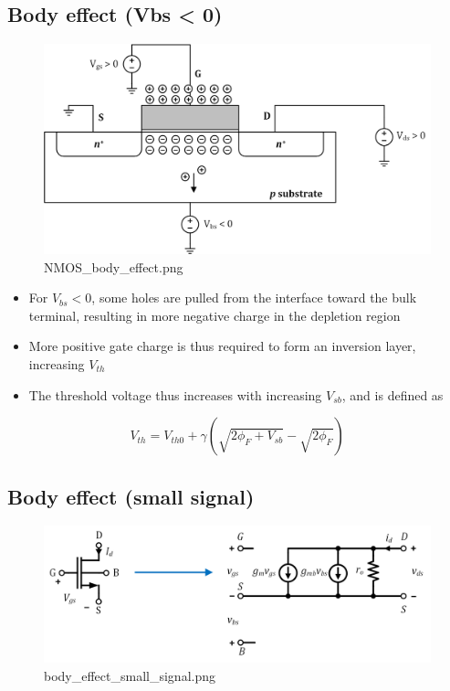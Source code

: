 \documentclass[11pt]{article}
\providecommand{\tightlist}{%
      \setlength{\itemsep}{0pt}\setlength{\parskip}{0pt}}
\begin{document}
    \hypertarget{body-effect-vbs-0}{%
\subsection{Body effect (Vbs \textless{} 0)}\label{body-effect-vbs-0}}

    \begin{figure}
\centering
\includegraphics{NMOS_body_effect.png}
\caption{NMOS\_body\_effect.png}
\end{figure}

    \begin{itemize}
\tightlist
\item
  For \(V_{bs} < 0\), some holes are pulled from the interface toward
  the bulk terminal, resulting in more negative charge in the depletion
  region
\item
  More positive gate charge is thus required to form an inversion layer,
  increasing \(V_{th}\)
\item
  The threshold voltage thus increases with increasing \(V_{sb}\), and
  is defined as
\end{itemize}

\begin{equation}
V_{th} = V_{th0} + \gamma (\sqrt{2\phi_F + V_{sb}} - \sqrt{2\phi_F})
\end{equation}

    \hypertarget{body-effect-small-signal}{%
\subsection{Body effect (small signal)}\label{body-effect-small-signal}}

    \begin{figure}
\centering
\includegraphics{body_effect_small_signal.png}
\caption{body\_effect\_small\_signal.png}
\end{figure}
\end{document}
